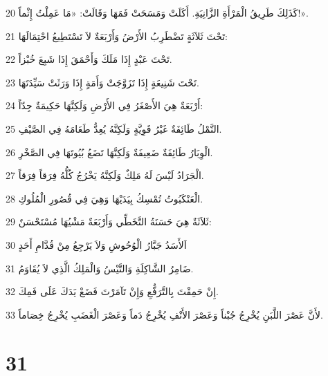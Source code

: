 \par 20 كَذَلِكَ طَرِيقُ الْمَرْأَةِ الزَّانِيَةِ. أَكَلَتْ وَمَسَحَتْ فَمَهَا وَقَالَتْ: «مَا عَمِلْتُ إِثْماً!».
\par 21 تَحْتَ ثَلاَثَةٍ تَضْطَرِبُ الأَرْضُ وَأَرْبَعَةٌ لاَ تَسْتَطِيعُ احْتِمَالَهَا:
\par 22 تَحْتَ عَبْدٍ إِذَا مَلَكَ وَأَحْمَقَ إِذَا شَبِعَ خُبْزاً.
\par 23 تَحْتَ شَنِيعَةٍ إِذَا تَزَوَّجَتْ وَأَمَةٍ إِذَا وَرَثَتْ سَيِّدَتَهَا.
\par 24 أَرْبَعَةٌ هِيَ الأَصْغَرُ فِي الأَرْضِ وَلَكِنَّهَا حَكِيمَةٌ جِدّاً:
\par 25 النَّمْلُ طَائِفَةٌ غَيْرُ قَوِيَّةٍ وَلَكِنَّهُ يُعِدُّ طَعَامَهُ فِي الصَّيْفِ.
\par 26 الْوِبَارُ طَائِفَةٌ ضَعِيفَةٌ وَلَكِنَّهَا تَضَعُ بُيُوتَهَا فِي الصَّخْرِ.
\par 27 الْجَرَادُ لَيْسَ لَهُ مَلِكٌ وَلَكِنَّهُ يَخْرُجُ كُلُّهُ فِرَقاً فِرَقاً.
\par 28 الْعَنْكَبُوتُ تُمْسِكُ بِيَدَيْهَا وَهِيَ فِي قُصُورِ الْمُلُوكِ.
\par 29 ثَلاَثَةٌ هِيَ حَسَنَةُ التَّخَطِّي وَأَرْبَعَةٌ مَشْيُهَا مُسْتَحْسَنٌ:
\par 30 اَلأَسَدُ جَبَّارُ الْوُحُوشِ وَلاَ يَرْجِعُ مِنْ قُدَّامِ أَحَدٍ
\par 31 ضَامِرُ الشَّاكِلَةِ وَالتَّيْسُ وَالْمَلِكُ الَّذِي لاَ يُقَاوَمُ.
\par 32 إِنْ حَمِقْتَ بِالتَّرَفُّعِ وَإِنْ تَآمَرْتَ فَضَعْ يَدَكَ عَلَى فَمِكَ.
\par 33 لأَنَّ عَصْرَ اللَّبَنِ يُخْرِجُ جُبْناً وَعَصْرَ الأَنْفِ يُخْرِجُ دَماً وَعَصْرَ الْغَضَبِ يُخْرِجُ خِصَاماً.

\chapter{31}

